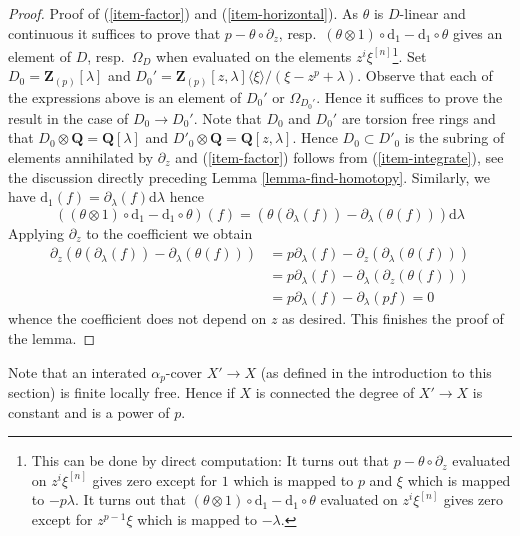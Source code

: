 \begin{proof}
\medskip\noindent
Proof of (\ref{item-factor}) and (\ref{item-horizontal}).
As $\theta$ is $D$-linear and continuous it suffices to prove that
$p - \theta \circ \partial_z$, resp.\ 
$(\theta \otimes 1) \circ \text{d}_1 - \text{d}_1 \circ \theta$
gives an element of $D$, resp.\ $\Omega_D$ when evaluated on the
elements $z^i\xi^{[n]}$\footnote{This can be done by direct computation:
It turns out that $p - \theta \circ \partial_z$ evaluated on
$z^i\xi^{[n]}$ gives zero except for $1$ which is mapped to $p$ and
$\xi$ which is mapped to $-p\lambda$. It turns out that 
$(\theta \otimes 1) \circ \text{d}_1 - \text{d}_1 \circ \theta$
evaluated on $z^i\xi^{[n]}$ gives zero except for $z^{p - 1}\xi$
which is mapped to $-\lambda$.}.
Set $D_0 = \mathbf{Z}_{(p)}[\lambda]$ and
$D_0' = \mathbf{Z}_{(p)}[z, \lambda]\langle \xi \rangle/(\xi - z^p + \lambda)$.
Observe that each of the expressions above is an element of
$D_0'$ or $\Omega_{D_0'}$. Hence it suffices to prove the result
in the case of $D_0 \to D_0'$. Note that $D_0$ and $D_0'$
are torsion free rings and that $D_0 \otimes \mathbf{Q} = \mathbf{Q}[\lambda]$
and $D'_0 \otimes \mathbf{Q} = \mathbf{Q}[z, \lambda]$.
Hence $D_0 \subset D'_0$ is the subring of elements annihilated
by $\partial_z$ and (\ref{item-factor})
follows from (\ref{item-integrate}), see the discussion directly preceding
Lemma \ref{lemma-find-homotopy}. Similarly, we have
$\text{d}_1(f) = \partial_\lambda(f)\text{d}\lambda$ hence
$$
\left((\theta \otimes 1) \circ \text{d}_1 - \text{d}_1 \circ \theta\right)(f)
=
\left(\theta(\partial_\lambda(f)) - \partial_\lambda(\theta(f))\right)
\text{d}\lambda
$$
Applying $\partial_z$ to the coefficient we obtain
\begin{align*}
\partial_z\left(
\theta(\partial_\lambda(f)) - \partial_\lambda(\theta(f))
\right)
& =
p \partial_\lambda(f) - \partial_z(\partial_\lambda(\theta(f))) \\
& =
p \partial_\lambda(f) - \partial_\lambda(\partial_z(\theta(f))) \\
& =
p \partial_\lambda(f) - \partial_\lambda(p f) = 0
\end{align*}
whence the coefficient does not depend on $z$ as desired.
This finishes the proof of the lemma.
\end{proof}

\noindent
Note that an interated $\alpha_p$-cover $X' \to X$ (as defined in the
introduction to this section) is finite locally free. Hence if $X$ is
connected the degree of $X' \to X$ is constant and is a power of $p$.


